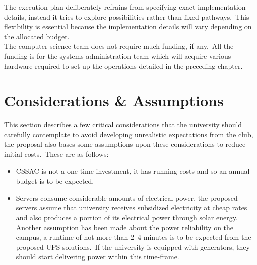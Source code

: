 

The execution plan deliberately refrains from specifying exact implementation details, instead it tries to explore
possibilities rather than fixed pathways.\ This flexibility is essential because the implementation details will vary
depending on the allocated budget.
\\
The computer science team does not require much funding, if any.\ All the funding is for the systems administration team
which will acquire various hardware required to set up the operations detailed in the preceding chapter.




\section{Considerations \& Assumptions}\label{sec:considerations-&-assumptions}
This section describes a few critical considerations that the university should carefully contemplate to avoid
developing unrealistic expectations from the club, the proposal also bases some assumptions upon these considerations
to reduce initial costs.\ These are as follows:

\begin{itemize}
    \item CSSAC is not a one-time investment, it has running costs and so an annual budget is to be expected.
    \item Servers consume considerable amounts of electrical power, the proposed servers assume that university receives
    subsidized electricity at cheap rates and also produces a portion of its electrical power through solar energy.\\
    Another assumption has been made about the power reliability on the campus, a runtime of not more than 2--4 minutes
    is to be expected from the proposed UPS solutions.\ If the university is equipped with generators, they should start
    delivering power within this time-frame.
\end{itemize}




